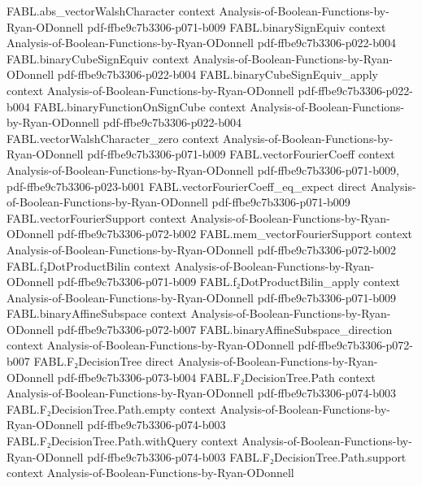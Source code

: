 \begin{theorem}
\proofstep
  {FABL.abs_vectorWalshCharacter}
  {context}
  {Analysis-of-Boolean-Functions-by-Ryan-ODonnell}
  {pdf-ffbe9c7b3306-p071-b009}
\proofstep
  {FABL.binarySignEquiv}
  {context}
  {Analysis-of-Boolean-Functions-by-Ryan-ODonnell}
  {pdf-ffbe9c7b3306-p022-b004}
\proofstep
  {FABL.binaryCubeSignEquiv}
  {context}
  {Analysis-of-Boolean-Functions-by-Ryan-ODonnell}
  {pdf-ffbe9c7b3306-p022-b004}
\proofstep
  {FABL.binaryCubeSignEquiv_apply}
  {context}
  {Analysis-of-Boolean-Functions-by-Ryan-ODonnell}
  {pdf-ffbe9c7b3306-p022-b004}
\proofstep
  {FABL.binaryFunctionOnSignCube}
  {context}
  {Analysis-of-Boolean-Functions-by-Ryan-ODonnell}
  {pdf-ffbe9c7b3306-p022-b004}
\proofstep
  {FABL.vectorWalshCharacter_zero}
  {context}
  {Analysis-of-Boolean-Functions-by-Ryan-ODonnell}
  {pdf-ffbe9c7b3306-p071-b009}
\proofstep
  {FABL.vectorFourierCoeff}
  {context}
  {Analysis-of-Boolean-Functions-by-Ryan-ODonnell}
  {pdf-ffbe9c7b3306-p071-b009,
    pdf-ffbe9c7b3306-p023-b001}
\proofstep
  {FABL.vectorFourierCoeff_eq_expect}
  {direct}
  {Analysis-of-Boolean-Functions-by-Ryan-ODonnell}
  {pdf-ffbe9c7b3306-p071-b009}
\proofstep
  {FABL.vectorFourierSupport}
  {context}
  {Analysis-of-Boolean-Functions-by-Ryan-ODonnell}
  {pdf-ffbe9c7b3306-p072-b002}
\proofstep
  {FABL.mem_vectorFourierSupport}
  {context}
  {Analysis-of-Boolean-Functions-by-Ryan-ODonnell}
  {pdf-ffbe9c7b3306-p072-b002}
\proofstep
  {FABL.f₂DotProductBilin}
  {context}
  {Analysis-of-Boolean-Functions-by-Ryan-ODonnell}
  {pdf-ffbe9c7b3306-p071-b009}
\proofstep
  {FABL.f₂DotProductBilin_apply}
  {context}
  {Analysis-of-Boolean-Functions-by-Ryan-ODonnell}
  {pdf-ffbe9c7b3306-p071-b009}
\proofstep
  {FABL.binaryAffineSubspace}
  {context}
  {Analysis-of-Boolean-Functions-by-Ryan-ODonnell}
  {pdf-ffbe9c7b3306-p072-b007}
\proofstep
  {FABL.binaryAffineSubspace_direction}
  {context}
  {Analysis-of-Boolean-Functions-by-Ryan-ODonnell}
  {pdf-ffbe9c7b3306-p072-b007}
\proofstep
  {FABL.F₂DecisionTree}
  {direct}
  {Analysis-of-Boolean-Functions-by-Ryan-ODonnell}
  {pdf-ffbe9c7b3306-p073-b004}
\proofstep
  {FABL.F₂DecisionTree.Path}
  {context}
  {Analysis-of-Boolean-Functions-by-Ryan-ODonnell}
  {pdf-ffbe9c7b3306-p074-b003}
\proofstep
  {FABL.F₂DecisionTree.Path.empty}
  {context}
  {Analysis-of-Boolean-Functions-by-Ryan-ODonnell}
  {pdf-ffbe9c7b3306-p074-b003}
\proofstep
  {FABL.F₂DecisionTree.Path.withQuery}
  {context}
  {Analysis-of-Boolean-Functions-by-Ryan-ODonnell}
  {pdf-ffbe9c7b3306-p074-b003}
\proofstep
  {FABL.F₂DecisionTree.Path.support}
  {context}
  {Analysis-of-Boolean-Functions-by-Ryan-ODonnell}

\end{theorem}
